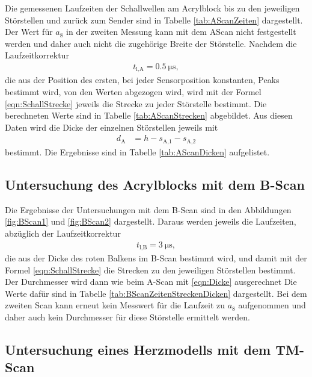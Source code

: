 Die gemessenen Laufzeiten der Schallwellen am Acrylblock bis zu den jeweiligen
Störstellen und zurück zum Sender sind in Tabelle \ref{tab:AScanZeiten} dargestellt.
Der Wert für $a_8$ in der zweiten Messung kann mit dem AScan nicht festgestellt
werden und daher auch nicht die zugehörige Breite der Störstelle.
Nachdem die Laufzeitkorrektur
\begin{align}
  t_\text{l,A} = \SI{0.5}{\micro\second},
\end{align}
die aus der Position des ersten, bei jeder Sensorposition konstanten, Peaks bestimmt
wird, von den Werten abgezogen wird, wird mit der Formel \eqref{eqn:SchallStrecke}
jeweils die Strecke zu jeder Störstelle bestimmt.
Die berechneten Werte sind in Tabelle \ref{tab:AScanStrecken}
abgebildet.
Aus diesen Daten wird die Dicke der einzelnen Störstellen jeweils mit
\begin{align}
  d_\text{A} & = h - s_\text{A,1} - s_\text{A,2}
  \label{eqn:Dicke}
\end{align}
bestimmt. Die Ergebnisse sind in Tabelle \ref{tab:AScanDicken} aufgelistet.

\subsection{Untersuchung des Acrylblocks mit dem B-Scan}

Die Ergebnisse der Untersuchungen mit dem B-Scan sind in den Abbildungen
\ref{fig:BScan1} und \ref{fig:BScan2} dargestellt.
Daraus werden jeweils die Laufzeiten, abzüglich der Laufzeitkorrektur
\begin{align}
  t_\text{l,B} = \SI{3}{\micro\second},
\end{align}
die aus der Dicke des roten Balkens im B-Scan bestimmt wird,
und damit mit der Formel
\ref{eqn:SchallStrecke} die Strecken zu den
jeweiligen Störstellen bestimmt. Der Durchmesser wird dann wie beim A-Scan mit
\eqref{eqn:Dicke} ausgerechnet
Die Werte dafür sind in Tabelle \ref{tab:BScanZeitenStreckenDicken}
dargestellt. Bei dem zweiten Scan kann erneut kein Messwert für die Laufzeit
zu $a_8$ aufgenommen und daher auch kein Durchmesser für diese
Störstelle ermittelt werden.

\subsection{Untersuchung eines Herzmodells mit dem TM-Scan}

